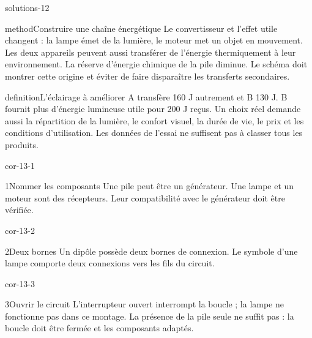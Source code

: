 \documentclass[12pt,twoside,openany]{book}
\begin{document}
\begin{pcFiche}{solutions-12}
\begin{pcEncadre}{method}{Construire une chaîne énergétique}
Le convertisseur et l’effet utile changent : la lampe émet de la lumière, le moteur met un objet en mouvement. Les deux appareils peuvent aussi transférer de l’énergie thermiquement à leur environnement. La réserve d’énergie chimique de la pile diminue. Le schéma doit montrer cette origine et éviter de faire disparaître les transferts secondaires.\par
\end{pcEncadre}
\label{defi-cor-12}
\begin{pcEncadre}{definition}{L’éclairage à améliorer}
A transfère 160 J autrement et B 130 J. B fournit plus d’énergie lumineuse utile pour 200 J reçus. Un choix réel demande aussi la répartition de la lumière, le confort visuel, la durée de vie, le prix et les conditions d’utilisation. Les données de l’essai ne suffisent pas à classer tous les produits.\par
\end{pcEncadre}
\end{pcFiche}
\clearpage{}
\begin{blocLivre}{cor-13-1}
\begin{corrige}{1}{Nommer les composants}
Une pile peut être un générateur. Une lampe et un moteur sont des récepteurs. Leur compatibilité avec le générateur doit être vérifiée.\par
\end{corrige}\end{blocLivre}
\begin{blocLivre}{cor-13-2}
\begin{corrige}{2}{Deux bornes}
Un dipôle possède deux bornes de connexion. Le symbole d’une lampe comporte deux connexions vers les fils du circuit.\par
\end{corrige}\end{blocLivre}
\begin{blocLivre}{cor-13-3}
\begin{corrige}{3}{Ouvrir le circuit}
L’interrupteur ouvert interrompt la boucle ; la lampe ne fonctionne pas dans ce montage. La présence de la pile seule ne suffit pas : la boucle doit être fermée et les composants adaptés.\par
{}
\end{corrige}\end{blocLivre}
\end{document}
